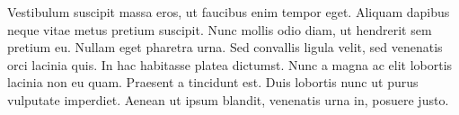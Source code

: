 \documentclass[a4paper]{article}
\begin{document}
Vestibulum suscipit massa eros, ut faucibus enim tempor eget. Aliquam dapibus neque vitae metus pretium suscipit. Nunc mollis odio diam, ut hendrerit sem pretium eu. Nullam eget pharetra urna. Sed convallis ligula velit, sed venenatis orci lacinia quis. In hac habitasse platea dictumst. Nunc a magna ac elit lobortis lacinia non eu quam. Praesent a tincidunt est. Duis lobortis nunc ut purus vulputate imperdiet. Aenean ut ipsum blandit, venenatis urna in, posuere justo. 

\printbibliography
\end{document}
